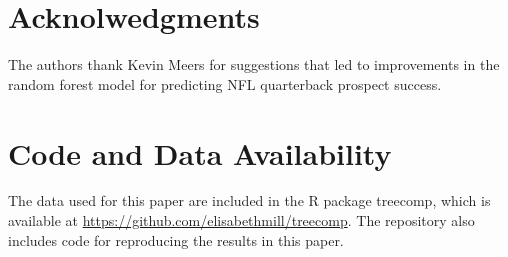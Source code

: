 \documentclass{article}
\begin{document}
\section*{Acknolwedgments}

The authors thank Kevin Meers for suggestions that led to improvements in the random forest model for predicting NFL quarterback prospect success.

\section*{Code and Data Availability}

The data used for this paper are included in the R package treecomp, which is available at \url{https://github.com/elisabethmill/treecomp}. The repository also includes code for reproducing the results in this paper.

\printbibliography
\end{document}
